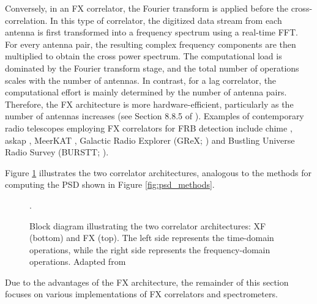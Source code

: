 Conversely, in an FX correlator, the Fourier transform is applied before the cross-correlation. In this type of correlator, the digitized data stream from each antenna is first transformed into a frequency spectrum using a real-time FFT. For every antenna pair, the resulting complex frequency components are then multiplied to obtain the cross power spectrum. The computational load is dominated by the Fourier transform stage, and the total number of operations scales with the number of antennas. In contrast, for a lag correlator, the computational effort is mainly determined by the number of antenna pairs. Therefore, the FX architecture is more hardware-efficient, particularly as the number of antennas increases (see Section 8.8.5 of \citealt{thompson2017interferometry}). Examples of contemporary radio telescopes employing FX correlators for FRB detection include \gls{chime} \citep{CHIME/FRB_2018}, \gls{askap} \citep{Shannon_2025}, MeerKAT \citep{MeerKAT}, Galactic Radio Explorer (GReX; \citealt{GReX}) and Bustling Universe Radio Survey (BURSTT; \citealt{BURSTT}).

Figure \ref{fig:corr_methods} illustrates the two correlator architectures, analogous to the methods for computing the PSD shown in Figure \ref{fig:psd_methods}.
\begin{figure}
	\centering
	\caption[Correlator architectures]{Block diagram illustrating the two correlator architectures: XF (bottom) and FX (top). The left side represents the time-domain operations, while the right side represents the frequency-domain operations. Adapted from \citet{thompson2017interferometry}}.
	\label{fig:corr_methods}
\end{figure}
Due to the advantages of the FX architecture, the remainder of this section focuses on various implementations of FX correlators and spectrometers.
